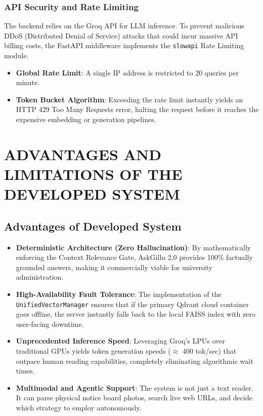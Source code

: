 \documentclass[12pt,a4paper]{report}
\begin{document}
\subsection{API Security and Rate Limiting}
The backend relies on the Groq API for LLM inference. To prevent malicious DDoS (Distributed Denial of Service) attacks that could incur massive API billing costs, the FastAPI middleware implements the \texttt{slowapi} Rate Limiting module.
\begin{itemize}
    \item \textbf{Global Rate Limit}: A single IP address is restricted to 20 queries per minute.
    \item \textbf{Token Bucket Algorithm}: Exceeding the rate limit instantly yields an HTTP 429 Too Many Requests error, halting the request before it reaches the expensive embedding or generation pipelines.
\end{itemize}

\chapter{ADVANTAGES AND LIMITATIONS OF THE DEVELOPED SYSTEM}

\section{Advantages of Developed System}
\begin{itemize}
    \item \textbf{Deterministic Architecture (Zero Hallucination)}: By mathematically enforcing the Context Relevance Gate, AskGillu 2.0 provides 100\% factually grounded answers, making it commercially viable for university administration.
    \item \textbf{High-Availability Fault Tolerance}: The implementation of the \texttt{UnifiedVectorManager} ensures that if the primary Qdrant cloud container goes offline, the server instantly falls back to the local FAISS index with zero user-facing downtime.
    \item \textbf{Unprecedented Inference Speed}: Leveraging Groq's LPUs over traditional GPUs yields token generation speeds ($\approx$ 400 tok/sec) that outpace human reading capabilities, completely eliminating algorithmic wait times.
    \item \textbf{Multimodal and Agentic Support}: The system is not just a text reader. It can parse physical notice board photos, search live web URLs, and decide which strategy to employ autonomously.
\end{itemize}
\end{document}
